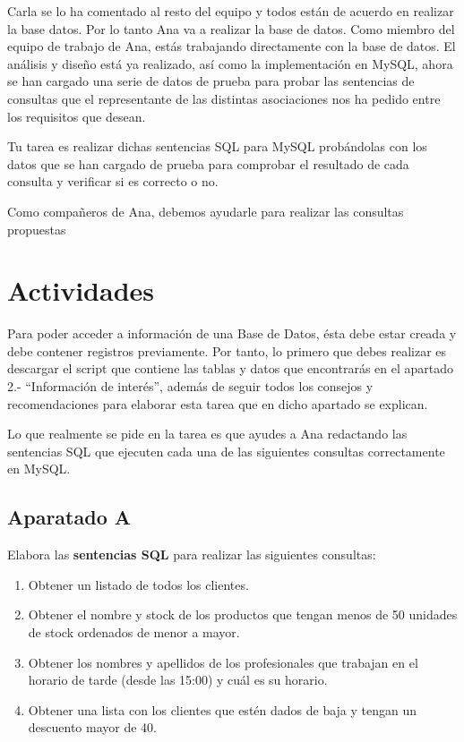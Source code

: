 Carla se lo ha comentado al resto del equipo y todos están de acuerdo en realizar la base datos. Por lo tanto Ana va a realizar la base de datos. Como miembro del equipo de trabajo de Ana, estás trabajando directamente con la base de datos. El análisis y diseño está ya realizado, así como la implementación en MySQL, ahora se han cargado una serie de datos de prueba para probar las sentencias de consultas que el representante de las distintas asociaciones nos ha pedido entre los requisitos que desean.

Tu tarea es realizar dichas sentencias SQL para MySQL probándolas con los datos que se han cargado de prueba para comprobar el resultado de cada consulta y verificar si es correcto o no.

Como compañeros de Ana, debemos ayudarle para realizar las consultas propuestas

\section{Actividades}
Para poder acceder a información de una Base de Datos, ésta debe estar creada y debe contener registros previamente. Por tanto, lo primero que debes realizar es descargar el script que contiene las tablas y datos que encontrarás en el apartado 2.- ``Información de interés'', además de seguir todos los consejos y recomendaciones para elaborar esta tarea que en dicho apartado se explican.

Lo que realmente se pide en la tarea es que ayudes a Ana redactando las sentencias SQL que ejecuten cada una de las siguientes consultas correctamente en MySQL.

\subsection{Aparatado A}
Elabora las \textbf{sentencias SQL} para realizar las siguientes consultas:

\begin{enumerate}
    \item Obtener un listado de todos los clientes.
    \item Obtener el nombre y stock de los productos que tengan menos de 50 unidades de stock ordenados de menor a mayor.
    \item Obtener los nombres y apellidos de los profesionales que trabajan en el horario de tarde (desde las 15:00) y cuál es su horario.
    \item Obtener una lista con los clientes que estén dados de baja y tengan un descuento mayor de 40.
\end{enumerate}

